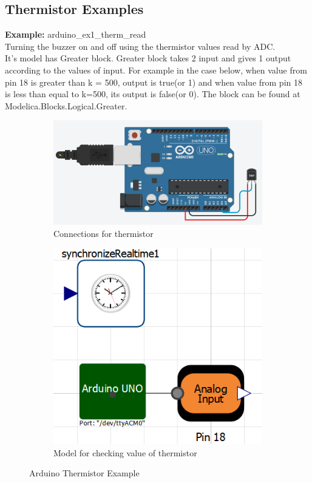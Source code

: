 \documentclass[12pt,a4paper]{report}
\begin{document}
\subsection{Thermistor Examples}
\textbf{Example:} arduino\_ex1\_therm\_read\\

Turning the buzzer on and off using the thermistor values read by ADC. \\

It’s model has Greater block. Greater block takes 2 input and gives 1 output according to the values of input. For example in the case below, when value from pin 18 is greater than k = 500, output is true(or 1) and when value from pin 18 is less than equal to k=500, its output is false(or 0). The block can be found at Modelica.Blocks.Logical.Greater.

\begin{figure}[H]
\begin{subfigure}{.5\textwidth}
\centering
\includegraphics[width =\linewidth]{6}
\caption{Connections for thermistor}
\end{subfigure}
\begin{subfigure}{.5\textwidth}
\centering
\includegraphics[width =\linewidth]{thermistor_ex1}
\caption{Model for checking value of thermistor}
\end{subfigure}
\caption {Arduino Thermistor Example}
\label{figure:19}
\end{figure}
\end{document}
